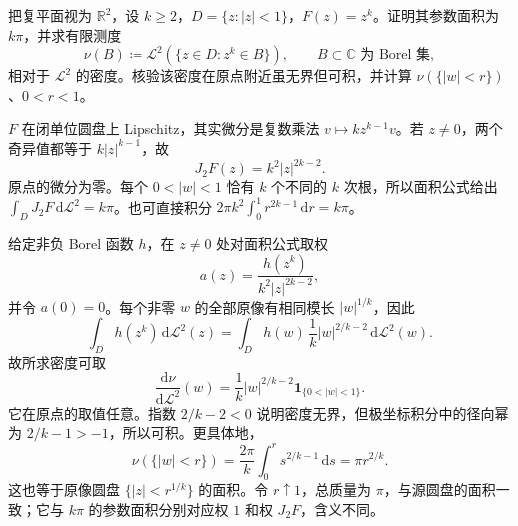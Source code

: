 \begin{exercise}\label{g3:ex:complex-power-area-pushforward}
	把复平面视为 \(\mathbb R^2\)，设 \(k\ge2\)，\(D=\{z:|z|<1\}\)，\(F(z)=z^k\)。证明其参数面积为 \(k\pi\)，并求有限测度
	\[
		\nu(B)\coloneqq\mathcal L^2(\{z\in D:z^k\in B\}),\qquad B\subset\mathbb C\text{ 为 Borel 集},
	\]
	相对于 \(\mathcal L^2\) 的密度。核验该密度在原点附近虽无界但可积，并计算 \(\nu(\{|w|<r\})\)、\(0<r<1\)。
\end{exercise}
\begin{solution}
	\(F\) 在闭单位圆盘上 Lipschitz，其实微分是复数乘法 \(v\mapsto kz^{k-1}v\)。若 \(z\ne0\)，两个奇异值都等于 \(k|z|^{k-1}\)，故
	\[
		J_2F(z)=k^2|z|^{2k-2}.
	\]
	原点的微分为零。每个 \(0<|w|<1\) 恰有 \(k\) 个不同的 \(k\) 次根，所以面积公式给出 \(\int_DJ_2F\,\mathrm d\mathcal L^2=k\pi\)。也可直接积分 \(2\pi k^2\int_0^1r^{2k-1}\,\mathrm dr=k\pi\)。

	给定非负 Borel 函数 \(h\)，在 \(z\ne0\) 处对面积公式取权
	\[
		a(z)=\frac{h(z^k)}{k^2|z|^{2k-2}},
	\]
	并令 \(a(0)=0\)。每个非零 \(w\) 的全部原像有相同模长 \(|w|^{1/k}\)，因此
	\[
		\int_Dh(z^k)\,\mathrm d\mathcal L^2(z)
		=\int_Dh(w)\,\frac1k|w|^{2/k-2}\,\mathrm d\mathcal L^2(w).
	\]
	故所求密度可取
	\[
		\frac{\mathrm d\nu}{\mathrm d\mathcal L^2}(w)
		=\frac1k|w|^{2/k-2}\mathbf1_{\{0<|w|<1\}}.
	\]
	它在原点的取值任意。指数 \(2/k-2<0\) 说明密度无界，但极坐标积分中的径向幂为 \(2/k-1>-1\)，所以可积。更具体地，
	\[
		\nu(\{|w|<r\})
		=\frac{2\pi}{k}\int_0^r s^{2/k-1}\,\mathrm ds
		=\pi r^{2/k}.
	\]
	这也等于原像圆盘 \(\{|z|<r^{1/k}\}\) 的面积。令 \(r\uparrow1\)，总质量为 \(\pi\)，与源圆盘的面积一致；它与 \(k\pi\) 的参数面积分别对应权 \(1\) 和权 \(J_2F\)，含义不同。
\end{solution}


